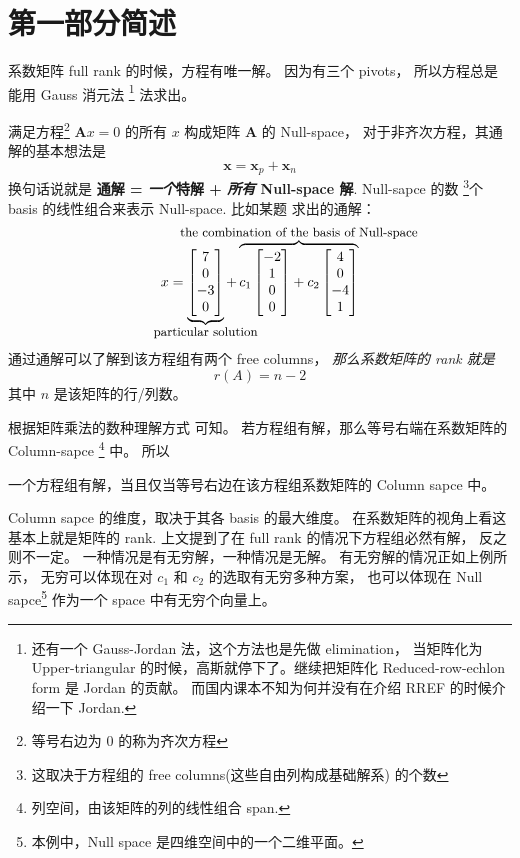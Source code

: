 \section{第一部分简述}

系数矩阵 full rank 的时候，方程有唯一解。
因为有三个 pivots， 所以方程总是能用 Gauss 消元法
\footnote{
    还有一个 Gauss-Jordan 法，这个方法也是先做 elimination，
    当矩阵化为 Upper-triangular 的时候，高斯就停下了。继续把矩阵化 
    Reduced-row-echlon form 是 Jordan 的贡献。
    而国内课本不知为何并没有在介绍 RREF 的时候介绍一下 Jordan.
}
法求出。

满足方程\footnote{等号右边为 $0$ 的称为齐次方程} 
$\mathbf Ax = 0$ 的所有 $x$ 构成矩阵 $\mathbf A$ 的
Null-space，
对于非齐次方程，其通解的基本想法是 
\[
    \mathbf x = {\mathbf x}_{p} + \mathbf x_n
\]
换句话说就是 \textbf{通解 = \emph{一个}特解 + \emph{所有} Null-space 解}.
Null-sapce 的数
\footnote{
    这取决于方程组的 free columns(这些自由列构成基础解系) 的个数
}个 basis 的线性组合来表示 Null-space. 比如某题
\cite[page 156]{strang}
求出的通解：
\[
    x = 
    \underbrace{
        \begin{bmatrix}
            7 \\ 0 \\ -3 \\ 0
        \end{bmatrix} 
    }_{\mathclap{\mbox{\small particular solution}}}
    + 
    \overbrace{
        c_1 \begin{bmatrix}
            -2 \\ 1 \\ 0 \\ 0
        \end{bmatrix}
        + c_2 \begin{bmatrix}
            4 \\ 0 \\ -4 \\ 1
        \end{bmatrix}
    }^{\mathclap{\mbox{\small the combination of the basis of Null-space}}}
\]
通过通解可以了解到该方程组有两个 free columns，
\emph{那么系数矩阵的 rank 就是}
\[
    r(A) = n - 2
\]
其中 $n$ 是该矩阵的行/列数。

根据矩阵乘法的数种理解方式 \cite[Section 2.4]{strang} 可知。
若方程组有解，那么等号右端在系数矩阵的 Column-sapce
\footnote{列空间，由该矩阵的列的线性组合 span.}
中。
所以
\begin{theorem}
    一个方程组有解，当且仅当等号右边在该方程组系数矩阵的 Column sapce 中。
\end{theorem}
Column sapce 的维度，取决于其各 basis 的最大维度。
在系数矩阵的视角上看这基本上就是矩阵的 rank.
上文提到了在 full rank 的情况下方程组必然有解，
反之则不一定。
一种情况是有无穷解，一种情况是无解。
有无穷解的情况正如上例所示，
无穷可以体现在对 $c_1$ 和 $c_2$ 的选取有无穷多种方案，
也可以体现在 Null sapce\footnote{本例中，Null space 是四维空间中的一个二维平面。} 作为一个 space 中有无穷个向量上。

